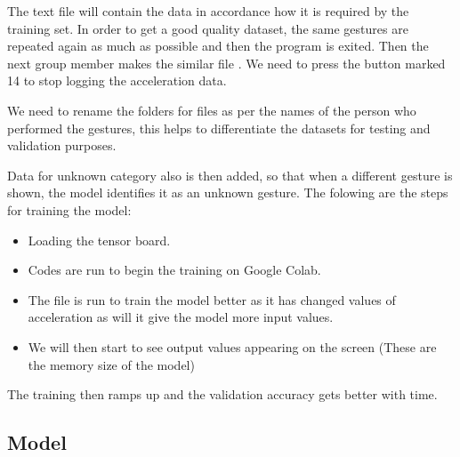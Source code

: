 \bigskip 

The text file will contain the data in accordance how it is required by the training set. In order to get a good quality dataset, the same gestures are repeated again as much as possible and then the program is exited. Then the next group member makes the similar file  . We need to press the button marked 14 to stop logging the acceleration data. \cite{Warden:2020}

We need to rename the folders for files  as per the names of the person who performed the gestures, this helps to differentiate the datasets for testing and validation purposes. \cite{Warden:2020}  

Data for unknown category also is then added, so that when a different gesture is shown, the model identifies it as an unknown gesture.  The folowing are the steps for training the model:

\begin{itemize}
    \item Loading the tensor board.
    \item Codes are run to begin the training on Google Colab.
    \item The file  is run to train the model better as it has changed values of acceleration as will it give the model more input values.
    \item We will then start to see output values appearing on the screen (These are the memory size of the model)
\end{itemize}

The training then ramps up and the validation accuracy gets better with time.











\subsection{Model}

